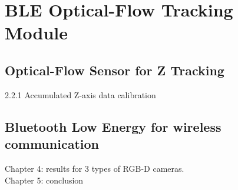 \section{BLE Optical-Flow Tracking Module}
\label{BLE_OF_TrackingModule}
%
%
\subsection{Optical-Flow Sensor for Z Tracking}
%
2.2.1 Accumulated Z-axis data calibration\\
%
%
%
\subsection{Bluetooth Low Energy for wireless communication}
%
%
%
%
%
%
%
Chapter 4: results for 3 types of RGB-D cameras.\\
Chapter 5: conclusion\\





































